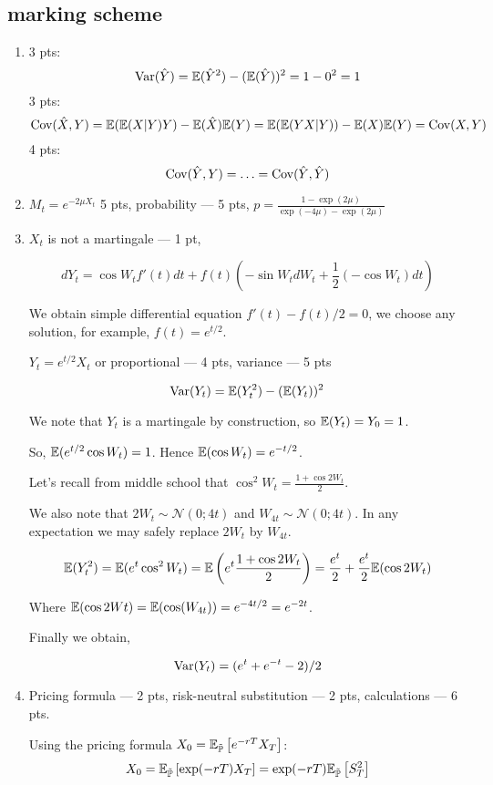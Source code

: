 \documentclass[12pt, a4paper]{article}
\newcommand{\cN}{\mathcal{N}}
\begin{document}
\subsection{marking scheme}

\begin{enumerate}
\item 3 pts:
\[
\operatorname{Var}(\hat{Y})=\mathbb{E}(\hat{Y}^2)-(\mathbb{E}(\hat{Y}))^2=1-0^2=1
\]
3 pts:
\[
\operatorname{Cov}(\hat{X},Y)=\mathbb{E}(\mathbb{E}(X|Y)Y)-\mathbb{E}(\hat{X})\mathbb{E}(Y)=\mathbb{E}(\mathbb{E}(YX|Y))-\mathbb{E}(X)\mathbb{E}(Y)=\operatorname{Cov}(X,Y)
\]
4 pts:
\[
\operatorname{Cov}(\hat{Y},Y)=\ldots=\operatorname{Cov}(\hat{Y},\hat{Y})
\]

\item $M_t=e^{-2\mu X_t}$ 5 pts, probability — 5 pts, $p=\frac{1-\exp(2\mu)}{\exp(-4\mu)-\exp(2\mu)}$

\item $X_t$ is not a martingale — 1 pt,

\[
dY_t = \cos W_t f'(t) dt + f(t)(-\sin W_t dW_t + \frac{1}{2}(-\cos W_t)dt)
\]

We obtain simple differential equation $f'(t)-f(t)/2=0$, we choose any solution, for example,  $f(t)=e^{t/2}$.

$Y_t=e^{t/2}X_t$ or proportional — 4 pts, variance — 5 pts

\[
\operatorname{Var}(Y_t)=\mathbb{E}(Y_t^2) - (\mathbb{E}(Y_t))^2
\]

We note that $Y_t$ is a martingale by construction, so $\mathbb{E}(Y_t) = Y_0 = 1$.

So, $\mathbb{E}(e^{t/2}\cos W_t) = 1$. Hence $\mathbb{E}(\cos W_t) = e^{-t/2}$.

Let's recall from middle school that $\cos^2 W_t = \frac{1+\cos 2W_t}{2}$.

We also note that $2W_t \sim \cN(0; 4t)$ and $W_{4t} \sim \cN(0; 4t)$. In any expectation we may safely replace $2W_t$ by $W_{4t}$.

\[
\mathbb{E}(Y_t^2) = \mathbb{E}(e^t \cos^2 W_t) = \mathbb{E}\left(e^t \frac{1+\cos 2W_t}{2}\right) = \frac{e^t}{2} + \frac{e^t}{2} \mathbb{E}(\cos 2W_t)
\]

Where $\mathbb{E}(\cos 2Wt) = \mathbb{E}(\cos(W_{4t})) = e^{-4t/2}=e^{-2t}$.

Finally we obtain,

\[
\operatorname{Var}(Y_t)=(e^t+e^{-t}-2)/2
\]

\item Pricing formula — 2 pts, risk-neutral substitution — 2 pts, calculations — 6 pts.


Using the pricing formula $X_0=\mathbb{E}_{\tilde{\mathbb{P}}} \left[e^{-rT}X_T \right]$:
\[
X_0=\mathbb{E}_{\tilde{\mathbb{P}}} \left[\exp(-rT)X_T \right]=\exp(-rT)\mathbb{E}_{\tilde{\mathbb{P}}} \left[S^2_T \right]
\]


\end{enumerate}
\end{document}
